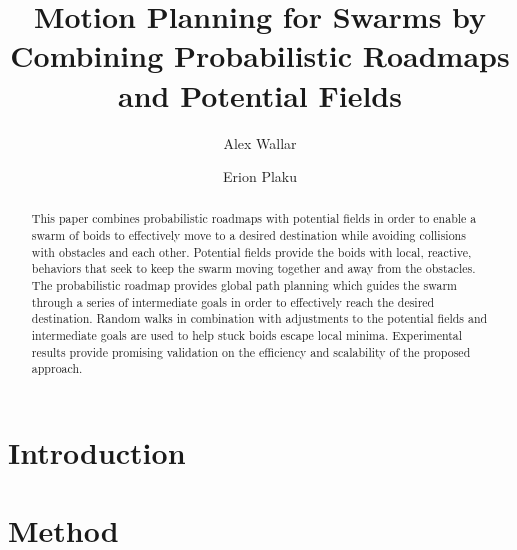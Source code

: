 \documentclass{llncs}
\begin{document}
\frontmatter
\pagestyle{headings}  
\addtocmark{} 

\mainmatter 

\title{Motion Planning for Swarms by Combining Probabilistic Roadmaps and
  Potential Fields}

\author{Alex Wallar \and Erion Plaku}



\maketitle
\begin{abstract}
This paper combines probabilistic roadmaps with potential fields in
order to enable a swarm of boids to effectively move to a desired
destination while avoiding collisions with obstacles and each
other. Potential fields provide the boids with local, reactive,
behaviors that seek to keep the swarm moving together and away from
the obstacles. The probabilistic roadmap provides global path planning
which guides the swarm through a series of intermediate goals in order
to effectively reach the desired destination. Random walks in
combination with adjustments to the potential fields and intermediate
goals are used to help stuck boids escape local minima.  Experimental
results provide promising validation on the efficiency
and scalability of the proposed approach.
\end{abstract}


\section{Introduction}
\label{sec:Intro}

\section{Method}
\label{sec:Method}
\end{document}

